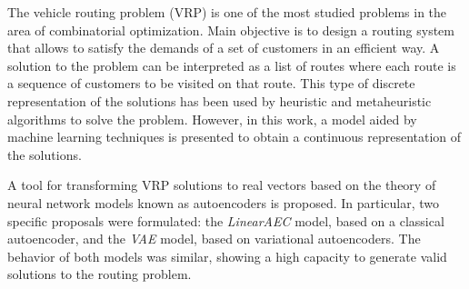 \begin{enabstract}
The vehicle routing problem (VRP) is one of the most studied problems in the area of combinatorial optimization. Main objective is to design a routing system that allows to satisfy the demands of a set of customers in an efficient way. A solution to the problem can be interpreted as a list of routes where each route is a sequence of customers to be visited on that route. This type of discrete representation of the solutions has been used by heuristic and metaheuristic algorithms to solve the problem. However, in this work, a model aided by machine learning techniques is presented to obtain a continuous representation of the solutions.

A tool for transforming VRP solutions to real vectors based on the theory of neural network models known as autoencoders is proposed. In particular, two specific proposals were formulated: the \textit{LinearAEC} model, based on a classical autoencoder, and the \textit{VAE} model, based on variational autoencoders. The behavior of both models was similar, showing a high capacity to generate valid solutions to the routing problem.
	
\end{enabstract}